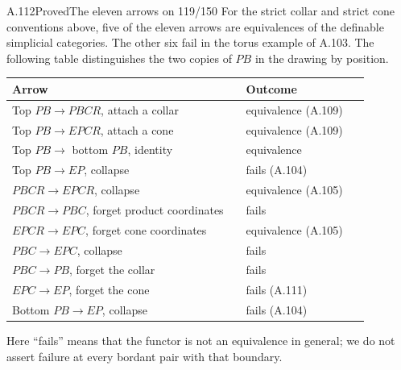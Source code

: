 \begin{saresult}{A.112}{Proved}{The eleven arrows on 119/150}
For the strict collar and strict cone conventions above, five of the
eleven arrows are equivalences of the definable simplicial categories.
The other six fail in the torus example of A.103. The following table
distinguishes the two copies of $PB$ in the drawing by position.
\begin{center}
\begin{tabular}{p{0.58\linewidth}p{0.30\linewidth}}
\toprule
Arrow & Outcome\\
\midrule
Top $PB\to PBCR$, attach a collar & equivalence (A.109)\\
Top $PB\to EPCR$, attach a cone & equivalence (A.109)\\
Top $PB\to$ bottom $PB$, identity & equivalence\\
Top $PB\to EP$, collapse & fails (A.104)\\
$PBCR\to EPCR$, collapse & equivalence (A.105)\\
$PBCR\to PBC$, forget product coordinates & fails\\
$EPCR\to EPC$, forget cone coordinates & equivalence (A.105)\\
$PBC\to EPC$, collapse & fails\\
$PBC\to PB$, forget the collar & fails\\
$EPC\to EP$, forget the cone & fails (A.111)\\
Bottom $PB\to EP$, collapse & fails (A.104)\\
\bottomrule
\end{tabular}
\end{center}
Here ``fails'' means that the functor is not an equivalence in general;
we do not assert failure at every bordant pair with that boundary.
\end{saresult}
